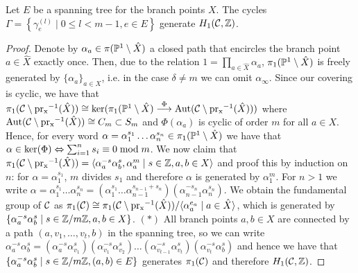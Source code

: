 \documentclass[main.tex]{subfiles}
\begin{document}
  \begin{thm}\label{thm:gen_set}
      Let $E$ be a spanning tree for the branch points $X$.
   The cycles $\Gamma = \left\{  \gamma_{e}^{(l)}  \mid  0 \le l <m-1,  e \in E  \right\}$ generate $\homo$.
  \end{thm}
  \begin{proof}
  Denote by $\alpha_a \in \pi(\P^1 \setminus \hat{X})$ a closed path that encircles the branch point $a \in \hat{X}$ exactly once. Then,  due to the relation $1 = \prod_{a \in \hat{X}} \alpha_a$,
  $\pi_1(\P^1 \setminus \hat{X})$ is freely generated by $\{ \alpha_a \}_{a \in X}$, i.e. in the case $\delta \ne m$ we can omit $\alpha_{\infty}$. \abstand
  Since our covering is cyclic, we have that $
  \pi_1(\cu \setminus \pr^{-1}(\hat{X})) \isom \ker(\pi_1(\P^1 \setminus \hat{X}) \overset{\Phi}{\To} \Aut(\cu \setminus \pr^{-1}(\hat{X})))$ where $\Aut(\cu \setminus \pr^{-1}(\hat{X})) \isom C_m
  \subset S_m$
  and $\Phi(\alpha_a)$ is cyclic of order $m$ for all $a \in X$. Hence, for every word $\alpha = \alpha_1^{s_1}\dots \alpha_n^{s_n} \in \pi_1(\P^1 \setminus \hat{X})$ we have that
  $\alpha \in \ker(\Phi) \eq \sum_{i=1}^n s_i \equiv 0 \bmod m$. \abstand
  We now claim that $\pi_1(\cu \setminus \pr^{-1}(\hat{X})) = \langle  \alpha_a^{-s} \alpha_b^{s},  \alpha_a^m   \mid  s \in \Z, a,b \in X  \rangle$
  and proof this by induction on $n$: for $\alpha = \alpha_1^{s_1}$, $m$ divides $s_1$ and therefore $\alpha$ is generated by $\alpha_1^m$. For $n > 1$ we write
  $\alpha = \alpha_1^{s_1}\dots \alpha_n^{s_n} = (\alpha_1^{s_1} \dots \alpha_{n-1}^{s_{n-1}+s_n})(\alpha_{n-1}^{-s_n}\alpha_n^{s_n})$. \abstand
  We obtain the fundamental group of $\cu$ as
  $\pi_1(\cu) \isom \pi_1(\cu \setminus \pr^{-1}(\hat{X})) / \langle  \alpha_a^{e_a}  \mid  a \in \hat{X}  \rangle$, which is generated by
  $\{  \alpha_a^{-s} \alpha_b^{s}  \mid  s \in \Z/m\Z,  a,b \in X  \}$. $(*)$ \abstand
  All branch points $a,b \in X$ are connected by a path $(a,v_1,\dots,v_t,b)$ in the spanning tree, so we can write $\alpha_a^{-s} \alpha_b^{s} = (\alpha_a^{-s}\alpha_{v_1}^{s})
  (\alpha_{v_1}^{-s}\alpha_{v_2}^{s})\dots(\alpha_{v_{t-1}}^{-s}\alpha_{v_t}^{s})(\alpha_{v_t}^{-s}\alpha_b^{s})$ and hence we have that
  $\{ \alpha_a^{-s} \alpha_b^{s}  \mid  s \in \Z/m\Z,  (a,b) \in E \}$ generates $\pi_1(\cu)$ and therefore $\homo$. \abstand

\end{proof}
\end{document}
